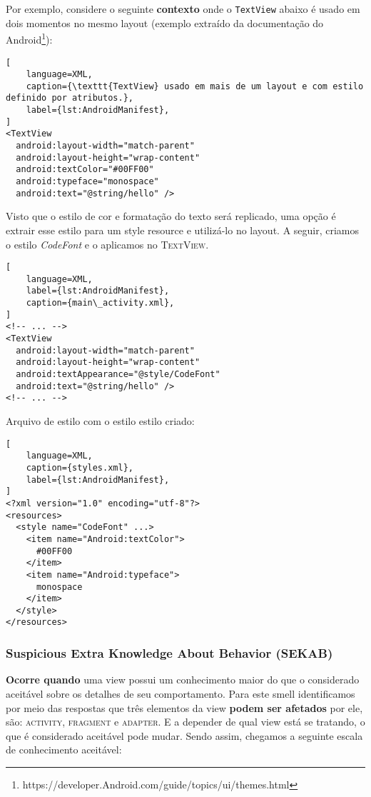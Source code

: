 Por exemplo, considere o seguinte \textbf{contexto} onde o \texttt{TextView} abaixo \'e usado em dois momentos no mesmo layout (exemplo extra\'ido da documenta\c{c}\~ao do Android\footnote{https://developer.Android.com/guide/topics/ui/themes.html}):

\begin{lstlisting}[
	language=XML, 
	caption={\texttt{TextView} usado em mais de um layout e com estilo definido por atributos.}, 
	label={lst:AndroidManifest},
]
<TextView
  android:layout-width="match-parent"
  android:layout-height="wrap-content"
  android:textColor="#00FF00"
  android:typeface="monospace"
  android:text="@string/hello" />
\end{lstlisting}

Visto que o estilo de cor e formata\c{c}\~ao do texto ser\'a replicado, uma op\c{c}\~ao \'e extrair esse estilo para um style resource e utiliz\'a-lo no layout. A seguir, criamos o estilo \textit{CodeFont} e o aplicamos no \textsc{TextView}.

\begin{lstlisting}[
	language=XML, 
	label={lst:AndroidManifest},
	caption={main\_activity.xml},
]
<!-- ... -->
<TextView
  android:layout-width="match-parent"
  android:layout-height="wrap-content"
  android:textAppearance="@style/CodeFont"
  android:text="@string/hello" />
<!-- ... -->
\end{lstlisting}

Arquivo de estilo com o estilo estilo  criado:

\begin{lstlisting}[
	language=XML, 
	caption={styles.xml}, 
	label={lst:AndroidManifest},
]
<?xml version="1.0" encoding="utf-8"?>
<resources>
  <style name="CodeFont" ...>
    <item name="Android:textColor">
      #00FF00
    </item>
    <item name="Android:typeface">
      monospace
    </item>
  </style>
</resources>
\end{lstlisting}


\subsubsection{Suspicious Extra Knowledge About Behavior (SEKAB)}

\textbf{Ocorre quando} uma view possui um conhecimento maior do que o considerado aceit\'avel sobre os detalhes de seu comportamento. Para este smell identificamos por meio das respostas que tr\^es elementos da view \textbf{podem ser afetados} por ele, s\~ao: \textsc{activity}, \textsc{fragment} e \textsc{adapter}. E a depender de qual view est\'a se tratando, o que \'e considerado aceit\'avel pode mudar. Sendo assim, chegamos a seguinte escala de conhecimento aceit\'avel:

